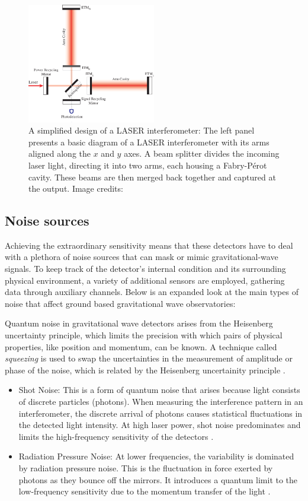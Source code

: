 \begin{figure}
    \centering
    \includegraphics[width=0.5\textwidth]{figures/basic_data_analysis/Michelson-interferometer.png}
    \caption{A simplified design of a LASER interferometer: The left panel presents a basic diagram of a LASER interferometer with its arms aligned along the $x$ and $y$ axes. A beam splitter divides the incoming laser light, directing it into two arms, each housing a Fabry-Pérot cavity. These beams are then merged back together and captured at the output. Image credits: \cite{Kondrashov:2008zr}}
    \label{fig:Michelson-interferometer}
\end{figure}

\subsection{Noise sources}
Achieving the extraordinary sensitivity means that these detectors have to deal with a plethora of noise sources that can mask or mimic gravitational-wave signals.  To keep track of the detector's internal condition and its surrounding physical environment, a variety of additional sensors are employed, gathering data through auxiliary channels. Below is an expanded look at the main types of noise that affect ground based gravitational wave observatories:

Quantum noise in gravitational wave detectors arises from the Heisenberg uncertainty principle, which limits the precision with which pairs of physical properties, like position and momentum, can be known. A technique called \textit{squeezing} is used to swap the uncertainties in the measurement of amplitude or phase of the noise, which is related by the Heisenberg uncertainity principle \cite{Oelker2016}. 
\begin{itemize}
    \item Shot Noise: This is a form of quantum noise that arises because light consists of discrete particles (photons). When measuring the interference pattern in an interferometer, the discrete arrival of photons causes statistical fluctuations in the detected light intensity. At high laser power, shot noise predominates and limits the high-frequency sensitivity of the detectors \cite{Tse2019}.
    \item Radiation Pressure Noise: At lower frequencies, the variability is dominated by radiation pressure noise. This is the fluctuation in force exerted by photons as they bounce off the mirrors. It introduces a quantum limit to the low-frequency sensitivity due to the momentum transfer of the light \cite{Kondrashov:2008zr}.
\end{itemize}

